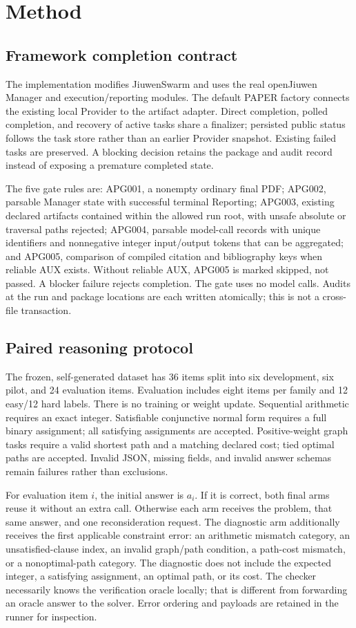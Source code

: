 \section{Method}
\subsection{Framework completion contract}
The implementation modifies JiuwenSwarm and uses the real openJiuwen Manager and execution/reporting modules. The default PAPER factory connects the existing local Provider to the artifact adapter. Direct completion, polled completion, and recovery of active tasks share a finalizer; persisted public status follows the task store rather than an earlier Provider snapshot. Existing failed tasks are preserved. A blocking decision retains the package and audit record instead of exposing a premature completed state.

The five gate rules are: APG001, a nonempty ordinary final PDF; APG002, parsable Manager state with successful terminal Reporting; APG003, existing declared artifacts contained within the allowed run root, with unsafe absolute or traversal paths rejected; APG004, parsable model-call records with unique identifiers and nonnegative integer input/output tokens that can be aggregated; and APG005, comparison of compiled citation and bibliography keys when reliable AUX exists. Without reliable AUX, APG005 is marked skipped, not passed. A blocker failure rejects completion. The gate uses no model calls. Audits at the run and package locations are each written atomically; this is not a cross-file transaction.

\subsection{Paired reasoning protocol}
The frozen, self-generated dataset has 36 items split into six development, six pilot, and 24 evaluation items. Evaluation includes eight items per family and 12 easy/12 hard labels. There is no training or weight update. Sequential arithmetic requires an exact integer. Satisfiable conjunctive normal form requires a full binary assignment; all satisfying assignments are accepted. Positive-weight graph tasks require a valid shortest path and a matching declared cost; tied optimal paths are accepted. Invalid JSON, missing fields, and invalid answer schemas remain failures rather than exclusions.

For evaluation item $i$, the initial answer is $a_i$. If it is correct, both final arms reuse it without an extra call. Otherwise each arm receives the problem, that same answer, and one reconsideration request. The diagnostic arm additionally receives the first applicable constraint error: an arithmetic mismatch category, an unsatisfied-clause index, an invalid graph/path condition, a path-cost mismatch, or a nonoptimal-path category. The diagnostic does not include the expected integer, a satisfying assignment, an optimal path, or its cost. The checker necessarily knows the verification oracle locally; that is different from forwarding an oracle answer to the solver. Error ordering and payloads are retained in the runner for inspection.

